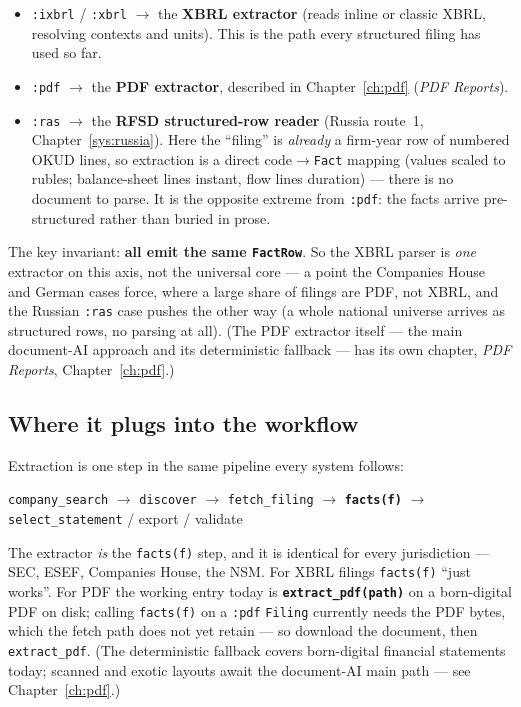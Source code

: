 \documentclass[11pt,a4paper]{report}
\begin{document}
\begin{itemize}
  \item \texttt{:ixbrl} / \texttt{:xbrl} \(\rightarrow\) the \textbf{XBRL extractor} (reads inline or
    classic XBRL, resolving contexts and units). This is the path every structured filing has used so far.
  \item \texttt{:pdf} \(\rightarrow\) the \textbf{PDF extractor}, described in Chapter~\ref{ch:pdf}
    (\emph{PDF Reports}).
  \item \texttt{:ras} \(\rightarrow\) the \textbf{RFSD structured-row reader} (Russia route~1,
    Chapter~\ref{sys:russia}). Here the ``filing'' is \emph{already} a firm-year row of numbered OKUD lines,
    so extraction is a direct code\(\to\)\texttt{Fact} mapping (values scaled to rubles; balance-sheet lines
    instant, flow lines duration) --- there is no document to parse. It is the opposite extreme from
    \texttt{:pdf}: the facts arrive pre-structured rather than buried in prose.
\end{itemize}

\noindent The key invariant: \textbf{all emit the same \texttt{FactRow}}. So the XBRL parser is
\emph{one} extractor on this axis, not the universal core --- a point the Companies House and German
cases force, where a large share of filings are PDF, not XBRL, and the Russian \texttt{:ras} case pushes
the other way (a whole national universe arrives as structured rows, no parsing at all). (The PDF extractor itself --- the main
document-AI approach and its deterministic fallback --- has its own chapter, \emph{PDF Reports},
Chapter~\ref{ch:pdf}.)

\subsection{Where it plugs into the workflow}

Extraction is one step in the same pipeline every system follows:

\begin{center}
\texttt{company\_search} \(\rightarrow\) \texttt{discover} \(\rightarrow\) \texttt{fetch\_filing}
\(\rightarrow\) \textbf{\texttt{facts(f)}} \(\rightarrow\) \texttt{select\_statement} / export / validate
\end{center}

\noindent The extractor \emph{is} the \texttt{facts(f)} step, and it is identical for every jurisdiction
--- SEC, ESEF, Companies House, the NSM. For XBRL filings \texttt{facts(f)} ``just works''. For PDF the
working entry today is \textbf{\texttt{extract\_pdf(path)}} on a born-digital PDF on disk; calling
\texttt{facts(f)} on a \texttt{:pdf} \texttt{Filing} currently needs the PDF bytes, which the fetch path
does not yet retain --- so download the document, then \texttt{extract\_pdf}. (The deterministic fallback covers born-digital
financial statements today; scanned and exotic layouts await the document-AI main path --- see
Chapter~\ref{ch:pdf}.)
\end{document}
